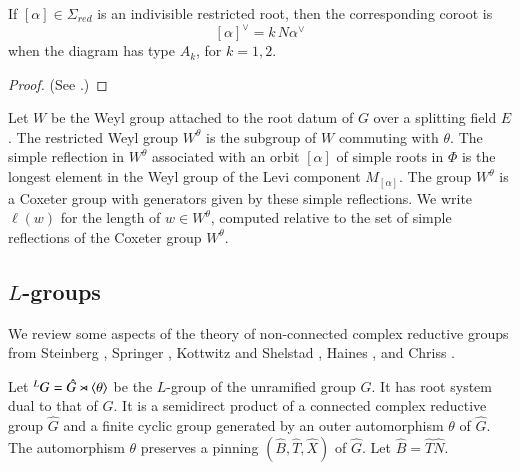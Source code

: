 \begin{lemma}\label{lemma:norm}
If $[\alpha]\in\Sigma_{red}$ is an indivisible restricted root, then the corresponding coroot is
\begin{equation}\label{eqn:norm}
[\alpha]^\vee = k\, N\alpha^\vee
\end{equation}
when the diagram has type $A_k$, for $k=1,2$.
\end{lemma}

\begin{proof}
(See \cite[1.3.9]{kottwitz1999foundations}.)
\end{proof}

Let $W$ be the
Weyl group attached to the root datum of $G$ over a splitting field $E$.
The restricted Weyl group $W^\theta$ is the subgroup of $W$
commuting with $\theta$.  The simple reflection in $W^\theta$ 
associated with an orbit $[\alpha]$ of simple roots in $\Phi$ is the
longest element in the Weyl group of the Levi component $M_{[\alpha]}$.
The group $W^\theta$
is a Coxeter group with generators given by these simple reflections.
We write $\ell(w)$ for the length of $w\in W^\theta$, computed relative to the set of simple reflections 
of the Coxeter group $W^\theta$.



\subsection{$L$-groups}


We review some aspects of the  theory of  non-connected complex reductive groups from
Steinberg \cite{steinberg1968endomorphisms},  Springer \cite{springer2010linear},
Kottwitz and Shelstad \cite{kottwitz1999foundations}, 
Haines \cite{haines2016dualities}, and
 Chriss \cite{chriss}.





Let ${}^LG = \hat G \rtimes \langle{\theta}\rangle$ be the $L$-group of the unramified group $G$.
It has root system dual to that of $G$.
It is a semidirect product of a connected complex reductive group $\hat G$ and a finite cyclic group
generated by an outer automorphism $\theta$ of $\hat G$.  The automorphism $\theta$ 
 preserves a pinning $(\hat B,\hat T,\hat X)$ of $\hat G$. Let $\hat B = \hat T\hat N$.

